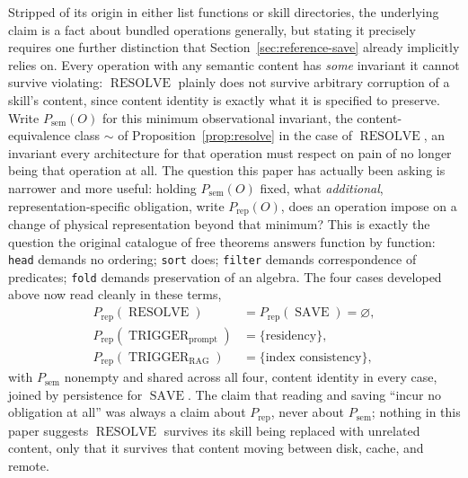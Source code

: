 \documentclass[11pt]{article}
\begin{document}
Stripped of its origin in either list functions or skill directories, the underlying claim is a fact about bundled operations generally, but stating it precisely requires one further distinction that Section~\ref{sec:reference-save} already implicitly relies on. Every operation with any semantic content has \emph{some} invariant it cannot survive violating: $\operatorname{RESOLVE}$ plainly does not survive arbitrary corruption of a skill's content, since content identity is exactly what it is specified to preserve. Write $P_{\text{sem}}(O)$ for this minimum observational invariant, the content-equivalence class $\sim$ of Proposition~\ref{prop:resolve} in the case of $\operatorname{RESOLVE}$, an invariant every architecture for that operation must respect on pain of no longer being that operation at all. The question this paper has actually been asking is narrower and more useful: holding $P_{\text{sem}}(O)$ fixed, what \emph{additional}, representation-specific obligation, write $P_{\text{rep}}(O)$, does an operation impose on a change of physical representation beyond that minimum? This is exactly the question the original catalogue of free theorems answers function by function: \texttt{head} demands no ordering; \texttt{sort} does; \texttt{filter} demands correspondence of predicates; \texttt{fold} demands preservation of an algebra. The four cases developed above now read cleanly in these terms,
\[
\begin{aligned}
P_{\text{rep}}(\operatorname{RESOLVE}) &= P_{\text{rep}}(\operatorname{SAVE}) = \varnothing, \\
P_{\text{rep}}(\operatorname{TRIGGER}_{\text{prompt}}) &= \{\text{residency}\}, \\
P_{\text{rep}}(\operatorname{TRIGGER}_{\text{RAG}}) &= \{\text{index consistency}\},
\end{aligned}
\]
with $P_{\text{sem}}$ nonempty and shared across all four, content identity in every case, joined by persistence for $\operatorname{SAVE}$. The claim that reading and saving ``incur no obligation at all'' was always a claim about $P_{\text{rep}}$, never about $P_{\text{sem}}$; nothing in this paper suggests $\operatorname{RESOLVE}$ survives its skill being replaced with unrelated content, only that it survives that content moving between disk, cache, and remote.
\end{document}
